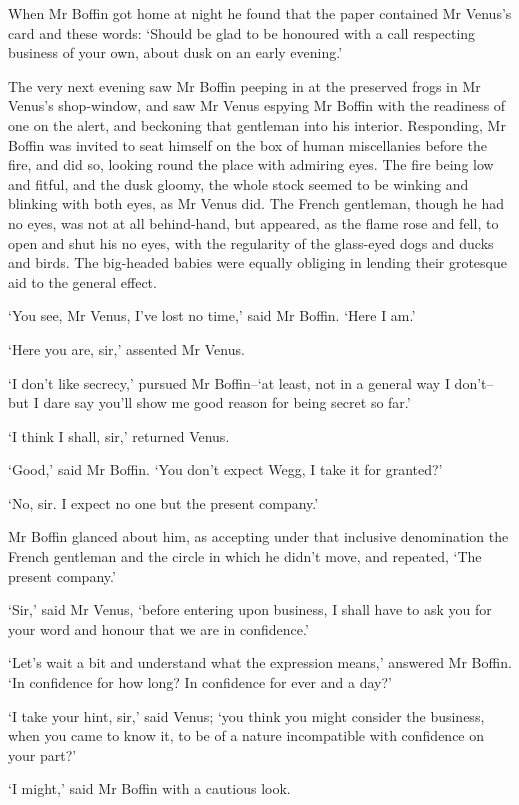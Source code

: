 When Mr Boffin got home at night he found that the paper contained Mr
Venus’s card and these words: ‘Should be glad to be honoured with a call
respecting business of your own, about dusk on an early evening.’

The very next evening saw Mr Boffin peeping in at the preserved frogs
in Mr Venus’s shop-window, and saw Mr Venus espying Mr Boffin with the
readiness of one on the alert, and beckoning that gentleman into his
interior. Responding, Mr Boffin was invited to seat himself on the box
of human miscellanies before the fire, and did so, looking round the
place with admiring eyes. The fire being low and fitful, and the dusk
gloomy, the whole stock seemed to be winking and blinking with both
eyes, as Mr Venus did. The French gentleman, though he had no eyes, was
not at all behind-hand, but appeared, as the flame rose and fell, to
open and shut his no eyes, with the regularity of the glass-eyed dogs
and ducks and birds. The big-headed babies were equally obliging in
lending their grotesque aid to the general effect.

‘You see, Mr Venus, I’ve lost no time,’ said Mr Boffin. ‘Here I am.’

‘Here you are, sir,’ assented Mr Venus.

‘I don’t like secrecy,’ pursued Mr Boffin--‘at least, not in a general
way I don’t--but I dare say you’ll show me good reason for being secret
so far.’

‘I think I shall, sir,’ returned Venus.

‘Good,’ said Mr Boffin. ‘You don’t expect Wegg, I take it for granted?’

‘No, sir. I expect no one but the present company.’

Mr Boffin glanced about him, as accepting under that inclusive
denomination the French gentleman and the circle in which he didn’t
move, and repeated, ‘The present company.’

‘Sir,’ said Mr Venus, ‘before entering upon business, I shall have to
ask you for your word and honour that we are in confidence.’

‘Let’s wait a bit and understand what the expression means,’ answered Mr
Boffin. ‘In confidence for how long? In confidence for ever and a day?’

‘I take your hint, sir,’ said Venus; ‘you think you might consider the
business, when you came to know it, to be of a nature incompatible with
confidence on your part?’

‘I might,’ said Mr Boffin with a cautious look.

